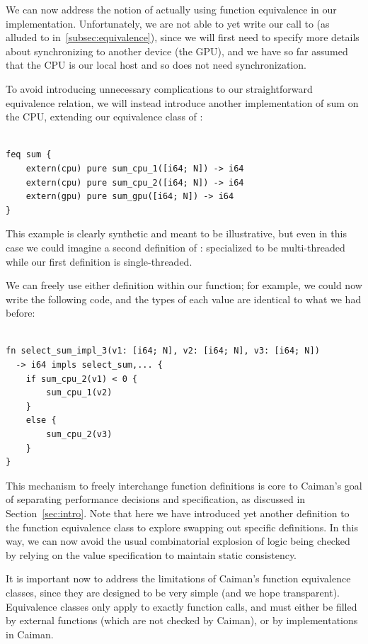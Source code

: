 We can now address the notion of actually using function equivalence in our implementation.  Unfortunately, we are not able to yet write our call to  (as alluded to in~\ref{subsec:equivalence}), since we will first need to specify more details about synchronizing to another device (the GPU), and we have so far assumed that the CPU is our local host and so does not need synchronization.

To avoid introducing unnecessary complications to our straightforward equivalence relation, we will instead introduce another implementation of sum on the CPU, extending our equivalence class of :
%
\begin{lstlisting}

feq sum {
    extern(cpu) pure sum_cpu_1([i64; N]) -> i64
    extern(cpu) pure sum_cpu_2([i64; N]) -> i64
    extern(gpu) pure sum_gpu([i64; N]) -> i64
}
\end{lstlisting}
%
This example is clearly synthetic and meant to be illustrative, but even in this case we could imagine a second definition of : specialized to be multi-threaded while our first definition is single-threaded.

We can freely use either definition within our  function; for example, we could now write the following code, and the types of each value are identical to what we had before:
%
\begin{lstlisting}

fn select_sum_impl_3(v1: [i64; N], v2: [i64; N], v3: [i64; N]) 
  -> i64 impls select_sum,... {
    if sum_cpu_2(v1) < 0 { 
        sum_cpu_1(v2)
    }
    else {
        sum_cpu_2(v3)
    }
}
\end{lstlisting}
%
This mechanism to freely interchange function definitions is core to Caiman's goal of separating performance decisions and specification, as discussed in Section~\ref{sec:intro}.  Note that here we have introduced yet another definition to the  function equivalence class to explore swapping out specific definitions.  In this way, we can now avoid the usual combinatorial explosion of logic being checked by relying on the value specification to maintain static consistency.

It is important now to address the limitations of Caiman's function equivalence classes, since they are designed to be very simple (and we hope transparent).  Equivalence classes only apply to exactly function calls, and must either be filled by external functions (which are not checked by Caiman), or by implementations in Caiman.


